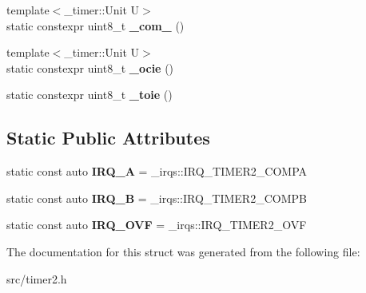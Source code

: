 \begin{DoxyCompactItemize}
\item 
{\footnotesize template$<$\+\_\+timer\+::\+Unit U$>$ }\\static constexpr uint8\+\_\+t {\bfseries \+\_\+com\+\_} ()\hypertarget{struct__timer2_1_1TimerDef_abbc0de13e62f594ab751822434e2c061}{}\label{struct__timer2_1_1TimerDef_abbc0de13e62f594ab751822434e2c061}

\item 
{\footnotesize template$<$\+\_\+timer\+::\+Unit U$>$ }\\static constexpr uint8\+\_\+t {\bfseries \+\_\+ocie} ()\hypertarget{struct__timer2_1_1TimerDef_ab77aee2b07c43d07a5c7e95c23d06013}{}\label{struct__timer2_1_1TimerDef_ab77aee2b07c43d07a5c7e95c23d06013}

\item 
static constexpr uint8\+\_\+t {\bfseries \+\_\+toie} ()\hypertarget{struct__timer2_1_1TimerDef_aa59a8f3a6a38e482611d438fc79307b4}{}\label{struct__timer2_1_1TimerDef_aa59a8f3a6a38e482611d438fc79307b4}

\end{DoxyCompactItemize}
\subsection*{Static Public Attributes}
\begin{DoxyCompactItemize}
\item 
static const auto {\bfseries I\+R\+Q\+\_\+A} = \+\_\+irqs\+::\+I\+R\+Q\+\_\+\+T\+I\+M\+E\+R2\+\_\+\+C\+O\+M\+PA\hypertarget{struct__timer2_1_1TimerDef_ad503a9efd5c167fcf37266cd6cf9240a}{}\label{struct__timer2_1_1TimerDef_ad503a9efd5c167fcf37266cd6cf9240a}

\item 
static const auto {\bfseries I\+R\+Q\+\_\+B} = \+\_\+irqs\+::\+I\+R\+Q\+\_\+\+T\+I\+M\+E\+R2\+\_\+\+C\+O\+M\+PB\hypertarget{struct__timer2_1_1TimerDef_ab0c4a6c52f3f57a3e2db98cf8740c704}{}\label{struct__timer2_1_1TimerDef_ab0c4a6c52f3f57a3e2db98cf8740c704}

\item 
static const auto {\bfseries I\+R\+Q\+\_\+\+O\+VF} = \+\_\+irqs\+::\+I\+R\+Q\+\_\+\+T\+I\+M\+E\+R2\+\_\+\+O\+VF\hypertarget{struct__timer2_1_1TimerDef_ae90a87cb6b1c430896596df0cd71a1e0}{}\label{struct__timer2_1_1TimerDef_ae90a87cb6b1c430896596df0cd71a1e0}

\end{DoxyCompactItemize}


The documentation for this struct was generated from the following file\+:\begin{DoxyCompactItemize}
\item 
src/timer2.\+h\end{DoxyCompactItemize}
